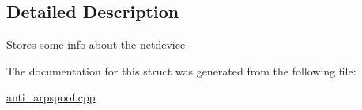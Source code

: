 \subsection{Detailed Description}
Stores some info about the netdevice 

The documentation for this struct was generated from the following file\+:\begin{DoxyCompactItemize}
\item 
\hyperlink{anti__arpspoof_8cpp}{anti\+\_\+arpspoof.\+cpp}\end{DoxyCompactItemize}
